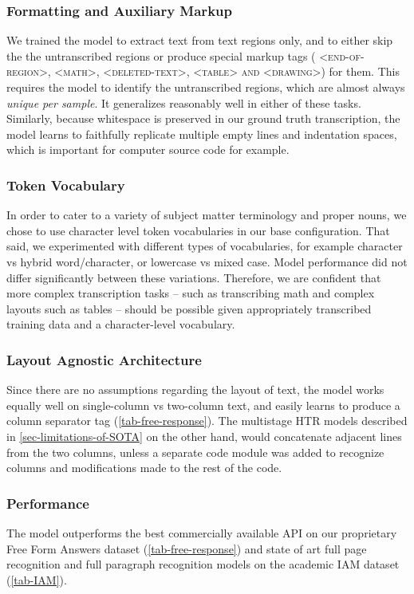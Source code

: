 \documentclass[runningheads]{llncs}
\begin{document}
\subsubsection{Formatting and Auxiliary Markup}
We trained the model to extract text from text regions only, and to either skip the the untranscribed regions or produce special markup tags (\textsc{ \textless{end-of-region\textgreater}, \textless{math\textgreater}, \textless{deleted-text\textgreater}, \textless{table\textgreater} and \textless{drawing\textgreater}}) for them.
This requires the model to identify the untranscribed regions, which are almost always \emph{unique per sample}.
It generalizes reasonably well in either of these tasks.
Similarly, because whitespace is preserved in our ground truth transcription, the model learns  to faithfully replicate multiple empty lines and indentation spaces, which is important for computer source code for example.

\subsubsection{Token Vocabulary}
In order to cater to a variety of subject matter terminology and proper nouns, we chose to use character level token vocabularies in our base configuration.
That said, we experimented with different types of vocabularies, for example character vs hybrid word/character, or lowercase vs mixed case.
Model performance did not differ significantly between these variations.
Therefore, we are confident that more complex transcription tasks -- such as transcribing math \citep{Deng2017ImagetoMarkupGW,DBLP:journals/corr/abs-1802-05415} and complex layouts such as tables -- should be possible given appropriately transcribed training data and a character-level vocabulary.

\subsubsection{Layout Agnostic Architecture}
Since there are no assumptions regarding the layout of text, the model works equally well on single-column vs two-column text, and easily learns to produce a column separator tag (\autoref{tab-free-response}).
The multistage HTR models described in \autoref{sec-limitations-of-SOTA} on the other hand, would concatenate adjacent lines from the two columns, unless a separate code module was added to recognize columns and modifications made to the rest of the code.


\subsubsection{Performance}
The model outperforms the best commercially available API on our proprietary Free Form Answers dataset (\autoref{tab-free-response}) and state of art full page recognition \citep{DBLP:journals/corr/BlucheLM16} and full paragraph recognition \citep{Bluche2016JointLS} models on the academic IAM dataset (\autoref{tab-IAM}).
\end{document}
